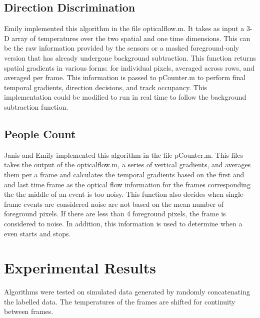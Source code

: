 \documentclass[12pt,oneside]{article} %
\begin{document}
\subsection{Direction Discrimination}
Emily implemented this algorithm in the file opticalflow.m. It takes as input a 3-D array of temperatures over the two spatial and one time dimensions. This can be the raw information provided by the sensors or a masked foreground-only version that has already undergone background subtraction. This function returns spatial gradients in various forms: for individual pixels, averaged across rows, and averaged per frame. This information is passed to pCounter.m to perform final temporal gradients, direction decisions, and track occupancy. This implementation could be modified to run in real time to follow the background subtraction function.

\subsection{People Count}
Janis and Emily implemented this algorithm in the file pCounter.m. This files takes the output of the opticalflow.m, a series of vertical gradients, and averages them per a frame and calculates the temporal gradients based on the first and and last time frame as the optical flow information for the frames corresponding the the middle of an event is too noisy. This function also decides when single-frame events are considered noise are not based on the mean number of foreground pixels. If there are less than 4 foreground pixels, the frame is considered to noise. In addition, this information is used to determine when a even starts and stops.

\section{Experimental Results}  %
Algorithms were tested on simulated data generated by randomly concatenating the labelled data.
The temperatures of the frames are shifted for continuity between frames. 
\end{document}

